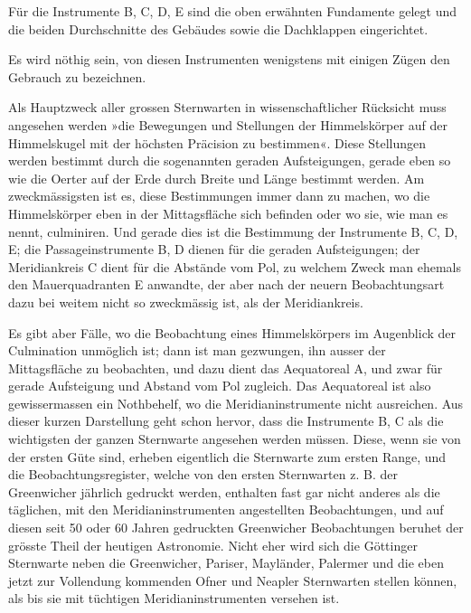 Für die Instrumente B, C, D, E sind die oben erwähnten Fundamente gelegt und die beiden Durchschnitte des Gebäudes sowie die Dachklappen eingerichtet.

Es wird nöthig sein, von diesen Instrumenten wenigstens mit einigen Zügen den Gebrauch zu bezeichnen.

Als Hauptzweck aller grossen Sternwarten in wissenschaftlicher Rücksicht muss angesehen werden »die Bewegungen und Stellungen der Himmelskörper auf der Himmelskugel mit der höchsten Präcision zu bestimmen«. Diese Stellungen werden bestimmt durch die sogenannten geraden Aufsteigungen, gerade eben so wie die Oerter auf der Erde durch Breite und Länge bestimmt werden. Am zweckmässigsten ist es, diese Bestimmungen immer dann zu machen, wo die Himmelskörper eben in der Mittagsfläche sich befinden oder wo sie, wie man es nennt, culminiren. Und gerade dies ist die Bestimmung der Instrumente B, C, D, E; die Passageinstrumente B, D dienen für die geraden Aufsteigungen; der Meridiankreis C dient für die Abstände vom Pol, zu welchem Zweck man ehemals den Mauerquadranten E anwandte, der aber nach der neuern Beobachtungsart dazu bei weitem nicht so zweckmässig ist, als der Meridiankreis.

Es gibt aber Fälle, wo die Beobachtung eines Himmelskörpers im Augenblick der Culmination unmöglich ist; dann ist man gezwungen, ihn ausser der Mittagsfläche zu beobachten, und dazu dient das Aequatoreal A, und zwar für gerade Aufsteigung und Abstand vom Pol zugleich. Das Aequatoreal ist also gewissermassen ein Nothbehelf, wo die Meridianinstrumente nicht ausreichen.
\clearpage{}
Aus dieser kurzen Darstellung geht schon hervor, dass die Instrumente B, C als die wichtigsten der ganzen Sternwarte angesehen werden müssen. Diese, wenn sie von der ersten Güte sind, erheben eigentlich die Sternwarte zum ersten Range, und die Beobachtungsregister, welche von den ersten Sternwarten z. B. der Greenwicher jährlich gedruckt werden, enthalten fast gar nicht anderes als die täglichen, mit den Meridianinstrumenten angestellten Beobachtungen, und auf diesen seit 50 oder 60 Jahren gedruckten Greenwicher Beobachtungen beruhet der grösste Theil der heutigen Astronomie. Nicht eher wird sich die Göttinger Sternwarte neben die Greenwicher, Pariser, Mayländer, Palermer und die eben jetzt zur Vollendung kommenden Ofner und Neapler Sternwarten stellen können, als bis sie mit tüchtigen Meridianinstrumenten versehen ist.

